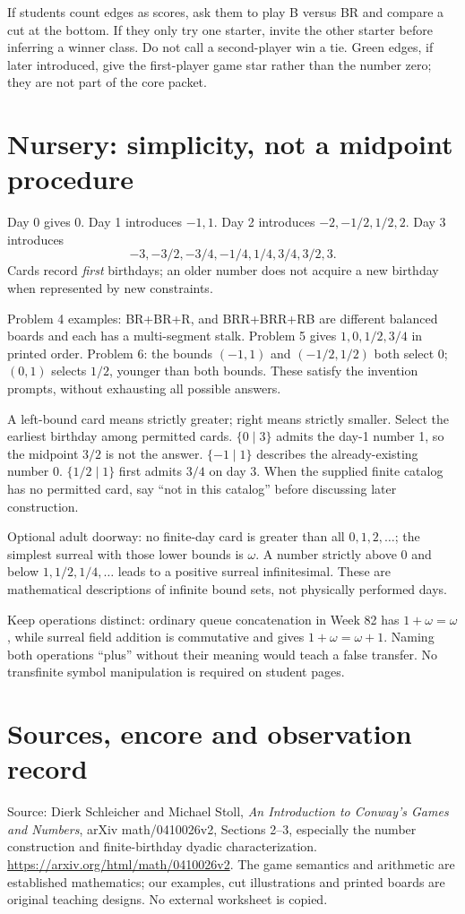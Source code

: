 \documentclass[11pt,letterpaper]{article}
\begin{document}
If students count edges as scores, ask them to play B versus BR and compare a cut at the bottom. If they only try one starter, invite the other starter before inferring a winner class. Do not call a second-player win a tie. Green edges, if later introduced, give the first-player game star rather than the number zero; they are not part of the core packet.
\newpage
\section*{Nursery: simplicity, not a midpoint procedure}
Day 0 gives 0. Day 1 introduces $-1,1$. Day 2 introduces $-2,-1/2,1/2,2$. Day 3 introduces\[ -3,-3/2,-3/4,-1/4,1/4,3/4,3/2,3. \] Cards record \emph{first} birthdays; an older number does not acquire a new birthday when represented by new constraints.

Problem 4 examples: BR+BR+R, and BRR+BRR+RB are different balanced boards and each has a multi-segment stalk. Problem 5 gives $1,0,1/2,3/4$ in printed order. Problem 6: the bounds $(-1,1)$ and $(-1/2,1/2)$ both select 0; $(0,1)$ selects $1/2$, younger than both bounds. These satisfy the invention prompts, without exhausting all possible answers.

A left-bound card means strictly greater; right means strictly smaller. Select the earliest birthday among permitted cards. $\{0\mid3\}$ admits the day-1 number 1, so the midpoint $3/2$ is not the answer. $\{-1\mid1\}$ describes the already-existing number 0. $\{1/2\mid1\}$ first admits $3/4$ on day 3. When the supplied finite catalog has no permitted card, say ``not in this catalog'' before discussing later construction.

Optional adult doorway: no finite-day card is greater than all $0,1,2,\ldots$; the simplest surreal with those lower bounds is $\omega$. A number strictly above 0 and below $1,1/2,1/4,\ldots$ leads to a positive surreal infinitesimal. These are mathematical descriptions of infinite bound sets, not physically performed days.

Keep operations distinct: ordinary queue concatenation in Week 82 has $1+\omega=\omega$, while surreal field addition is commutative and gives $1+\omega=\omega+1$. Naming both operations ``plus'' without their meaning would teach a false transfer. No transfinite symbol manipulation is required on student pages.
\newpage
\section*{Sources, encore and observation record}
Source: Dierk Schleicher and Michael Stoll, \emph{An Introduction to Conway's Games and Numbers}, arXiv math/0410026v2, Sections 2--3, especially the number construction and finite-birthday dyadic characterization. \url{https://arxiv.org/html/math/0410026v2}. The game semantics and arithmetic are established mathematics; our examples, cut illustrations and printed boards are original teaching designs. No external worksheet is copied.
\end{document}

